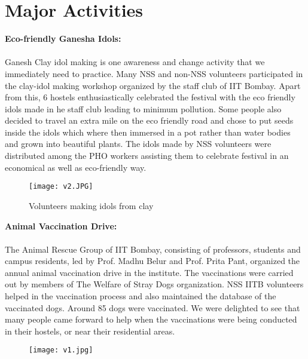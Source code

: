 \section*{ \LARGE Major Activities}
\noindent \textbf{\Large Eco-friendly Ganesha Idols:}\\ \\
Ganesh Clay idol making is one awareness and change activity that we immediately need to practice. Many NSS and non-NSS volunteers participated in the clay-idol making workshop organized by the staff club of IIT Bombay. Apart from this, 6 hostels enthusiastically celebrated the festival with the eco friendly idols made in he staff club leading to minimum pollution. Some people also decided to travel an extra mile on the eco friendly road and chose to put seeds inside the idols which where then immersed in a pot rather than water bodies and grown into beautiful plants.
The idols made by NSS volunteers were distributed among the PHO workers assisting them to celebrate festival in an economical as well as eco-friendly way.\\

\begin{figure}[H]
\centering
\texttt{[image: v2.JPG]}
\caption*{Volunteers making idols from clay}
\end{figure}

\noindent \textbf{\Large \linebreak Animal Vaccination Drive:}\\ \\The Animal Rescue Group of IIT Bombay, consisting of professors, students and campus residents, led by Prof. Madhu Belur and Prof. Prita Pant, organized the annual animal vaccination drive in the institute. The vaccinations were carried out by members of The Welfare of Stray Dogs organization. NSS IITB volunteers helped in the vaccination process and also maintained the database of the vaccinated dogs. Around 85 dogs were vaccinated. We were delighted to see that many people came forward to help when the vaccinations were being conducted in their hostels, or near their residential areas.

\begin{figure}[H]
\centering
\texttt{[image: v1.jpg]}
\end{figure}


